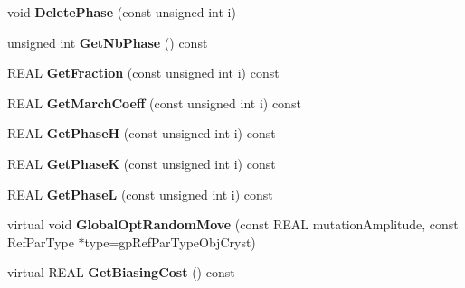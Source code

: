 \begin{DoxyCompactItemize}
void {\bfseries Delete\+Phase} (const unsigned int i)
\item 
\mbox{\label{class_obj_cryst_1_1_texture_march_dollase_a0ec5150b06e5b25825ba581b39e60fb9}} 
unsigned int {\bfseries Get\+Nb\+Phase} () const
\item 
\mbox{\label{class_obj_cryst_1_1_texture_march_dollase_a02f12d7afcc076e0c762e854a96b88ef}} 
R\+E\+AL {\bfseries Get\+Fraction} (const unsigned int i) const
\item 
\mbox{\label{class_obj_cryst_1_1_texture_march_dollase_aa38e895a82e2aa32419ae5d1ca3402f7}} 
R\+E\+AL {\bfseries Get\+March\+Coeff} (const unsigned int i) const
\item 
\mbox{\label{class_obj_cryst_1_1_texture_march_dollase_acdbde901cddd1ec65cdda8c2cb3259ed}} 
R\+E\+AL {\bfseries Get\+PhaseH} (const unsigned int i) const
\item 
\mbox{\label{class_obj_cryst_1_1_texture_march_dollase_a275c8d15bdb5ba958bd1d08b551b3958}} 
R\+E\+AL {\bfseries Get\+PhaseK} (const unsigned int i) const
\item 
\mbox{\label{class_obj_cryst_1_1_texture_march_dollase_ad21dfb70be30639594d10029dde1dc50}} 
R\+E\+AL {\bfseries Get\+PhaseL} (const unsigned int i) const
\item 
\mbox{\label{class_obj_cryst_1_1_texture_march_dollase_a405f1b4548c874b857718534c87b2974}} 
virtual void {\bfseries Global\+Opt\+Random\+Move} (const R\+E\+AL mutation\+Amplitude, const Ref\+Par\+Type $\ast$type=gp\+Ref\+Par\+Type\+Obj\+Cryst)
\item 
\mbox{\label{class_obj_cryst_1_1_texture_march_dollase_a6793ac708817671228626ad73a128e36}} 
virtual R\+E\+AL {\bfseries Get\+Biasing\+Cost} () const
\item 
\mbox{\label{class_obj_cryst_1_1_texture_march_dollase_a176e4e128d42d7627ffcedfdde3e0fd3}} 

\end{DoxyCompactItemize}
